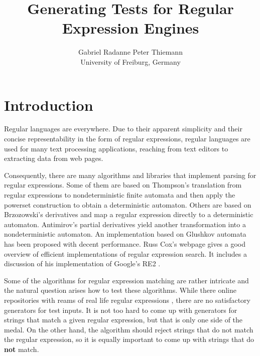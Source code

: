 \documentclass{article}
\begin{document}
\title{Generating Tests for Regular Expression Engines}

\author{Gabriel Radanne \qquad Peter Thiemann \\ University of Freiburg, Germany}



\maketitle

\begin{abstract}
  
\end{abstract}

\section{Introduction}

Regular languages are everywhere. Due to their apparent simplicity and
their concise representability in the form of regular expressions,
regular languages are used for many text processing
applications, reaching from text editors
\cite{DBLP:journals/cacm/Thompson68} to extracting data from web
pages.

Consequently, there are many algorithms and libraries that implement
parsing for regular expressions. Some of them are based on Thompson's
translation from regular expressions to nondeterministic finite
automata and then apply the powerset construction to obtain a
deterministic automaton. Others are based on Brzozowski's derivatives
\cite{Brzozowski1964} and
map a regular expression directly to a deterministic
automaton. Antimirov's partial derivatives \cite{Antimirov96Partial}
yield another transformation into a nondeterministic automaton. An
implementation based on Glushkov automata has been proposed
\cite{DBLP:conf/icfp/FischerHW10} with decent performance.
Russ Cox's webpage gives a good overview
of efficient implementations of regular expression search. It includes
a discussion of his implementation of Google's RE2 \cite{cox10:_regul_expres_match_wild}.

Some of the algorithms for regular expression matching are rather
intricate and the natural question arises how to test these algorithms. 
While there online repositories with reams of real life regular
expressions \cite{regul_expres_librar}, there are no satisfactory
generators for test inputs. It is not too hard to come up with
generators for strings that match a given regular expression, but that
is only one side of the medal. On the other hand, the algorithm should
reject strings that do not match the regular expression, so it is
equally important to come up with strings that do \textbf{not} match.
\end{document}
